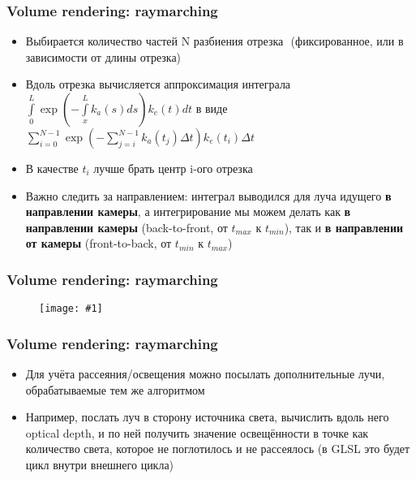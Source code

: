 \documentclass{beamer}
\newcommand{\slideimage}[1]{
  \begin{figure}
    \begin{adjustbox}{width=\textwidth, totalheight=\textheight-2\baselineskip-2\baselineskip,keepaspectratio}
      \texttt{[image: \#1]}
    \end{adjustbox}
  \end{figure}
}
\begin{document}
\begin{frame}[fragile]
\frametitle{Volume rendering: raymarching}
\begin{itemize}
\item Выбирается количество частей N разбиения отрезка \begin{math}[t_{min}, t_{max}]\end{math} (фиксированное, или в зависимости от длины отрезка)
\pause
\item Вдоль отрезка вычисляется аппроксимация интеграла \begin{math}\int\limits_0^L \exp\left(-\int\limits_x^L k_a(s) ds\right) k_e(t) dt\end{math} в виде \begin{math}\sum\limits_{i=0}^{N-1} \exp\left(-\sum\limits_{j=i}^{N-1} k_a(t_j) \Delta t\right) k_e(t_i) \Delta t\end{math}
\pause
\item В качестве \begin{math}t_i\end{math} лучше брать центр i-ого отрезка
\pause
\item Важно следить за направлением: интеграл выводился для луча идущего \textbf{в направлении камеры}, а интегрирование мы можем делать как \textbf{в направлении камеры} (back-to-front, от \begin{math}t_{max}\end{math} к \begin{math}t_{min}\end{math}), так и \textbf{в направлении от камеры} (front-to-back, от \begin{math}t_{min}\end{math} к \begin{math}t_{max}\end{math})
\end{itemize}
\end{frame}

\begin{frame}[fragile]
\frametitle{Volume rendering: raymarching}
\slideimage{raymarching-1.png}
\end{frame}

\begin{frame}[fragile]
\frametitle{Volume rendering: raymarching}
\begin{itemize}
\item Для учёта рассеяния/освещения можно посылать дополнительные лучи, обрабатываемые тем же алгоритмом
\pause
\item Например, послать луч в сторону источника света, вычислить вдоль него optical depth, и по ней получить значение освещённости в точке как количество света, которое не поглотилось и не рассеялось (в GLSL это будет цикл внутри внешнего цикла)
\end{itemize}
\end{frame}
\end{document}
